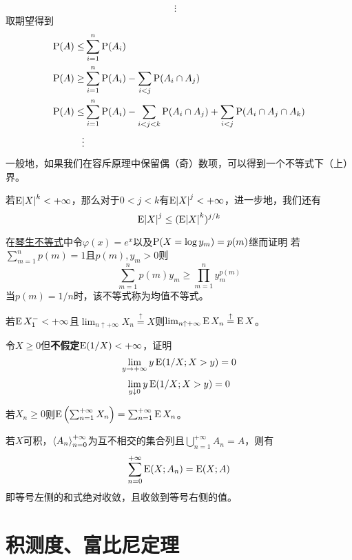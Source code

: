 \documentclass[../main.tex]{subfiles}
\begin{document}
\begin{exercise}
\begin{align*}
	\vdots&
\end{align*}
取期望得到
\begin{align*}
	\operatorname{\mathrm{P}}(A)\leq&\sum_{i=1}^n\operatorname{\mathrm{P}}(A_i)\\
	\operatorname{\mathrm{P}}(A)\geq&\sum_{i=1}^n\operatorname{\mathrm{P}}(A_i)-\sum_{i<j}\operatorname{\mathrm{P}}(A_i\cap A_j)\\
	\operatorname{\mathrm{P}}(A)\leq&\sum_{i=1}^n\operatorname{\mathrm{P}}(A_i)-\sum_{i<j<k}\operatorname{\mathrm{P}}(A_i\cap A_j)+\sum_{i<j}\operatorname{\mathrm{P}}(A_i\cap A_j\cap A_k)\\
	\vdots&
\end{align*}
一般地，如果我们在容斥原理中保留偶（奇）数项，可以得到一个不等式下（上）界。
\item 若\(\E \envert{X}^k<+\infty\)，那么对于\(0<j<k\)有\(\E \envert{X}^j<+\infty\)，进一步地，我们还有
\[\E\envert{X}^j\leq(\E \envert{X}^k)^{j/k}\]
\item 在\hyperref[thm:1.6.2]{琴生不等式}中令\(\varphi(x)=e^x\)以及\(\operatorname{\mathrm{P}}(X=\log y_m)=p(m)\)继而证明
若\(\sum_{m=1}^np(m)=1\)且\(p(m),y_m>0\)则
\[\sum_{m=1}^np(m)y_m\geq\prod_{m=1}^ny_m^{p(m)}\]
当\(p(m)=1/n\)时，该不等式称为均值不等式。
\item 若\(\operatorname{E} X_1^-<+\infty\)且\(\lim_{n\uparrow+\infty}X_n\stackrel{\uparrow}{=}X\)则\(\lim_{n\uparrow+\infty}\operatorname{E} X_n\stackrel{\uparrow}{=}\operatorname{E} X\)。
\item 令\(X\geq0\)但\textbf{不假定}\(\operatorname{E} (1/X)<+\infty\)，证明
\[\lim\limits_{y\rightarrow+\infty}y\operatorname{E}(1/X;X>y)=0\]
\[\lim\limits_{y\downarrow 0}y\operatorname{E}(1/X;X>y)=0\]
\item 若\(X_n\geq 0\)则\(\E\del{\sum_{n=1}^{+\infty}X_n}=\sum_{n=1}^{+\infty}\E X_n\)。
\item 若\(X\)可积，\(\left<A_n\right>^{+\infty}_{n=0}\)为互不相交的集合列且\(\bigcup_{n=1}^{+\infty}A_n=A\)，则有
\[\sum_{n=0}^{+\infty}\operatorname{E}(X;A_n)=\operatorname{E}(X;A)\]
即等号左侧的和式绝对收敛，且收敛到等号右侧的值。
\end{exercise}

\section{积测度、富比尼定理} \label{sec:1.7}
\begin{theorem}
\label{thm:1.7.2}
\end{theorem}
\begin{exercise}
	\item
	\item
	\item
	\item \label{e1.7.4}
\end{exercise}
\end{document}
